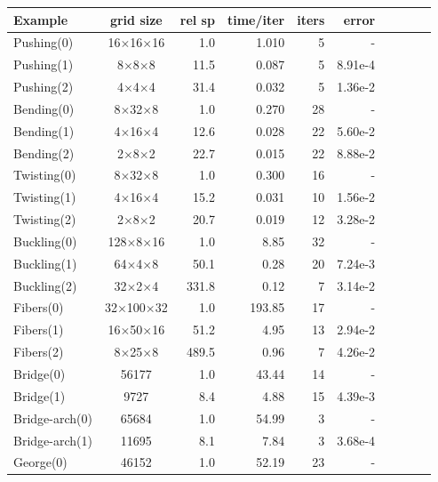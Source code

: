 \begin{table}[!h]
	\centering
	\footnotesize
	\begin{tabular}{l c r r r r r r r r}
		\hline 
		\textbf{Example} &\textbf{grid size}&\textbf{rel sp}&\textbf{time/iter}&\textbf{iters}&\textbf{error}\\
		\hline
		{\color{HiResColor}Pushing(0)} &16$\times$16$\times$16&1.0 &1.010 &5&-\\
		{\color{DDFEMColor}Pushing(1)} &8$\times$8$\times$8   &11.5&0.087&5&8.91e-4\\
		{\color{DDFEMColor}Pushing(2)} &4$\times$4$\times$4   &31.4&0.032&5&1.36e-2\\
		\hline 
		{\color{HiResColor}Bending(0)} &8$\times$32$\times$8&1.0   &0.270 &28&-\\
		{\color{DDFEMColor}Bending(1)} &4$\times$16$\times$4&12.6  &0.028 & 22& 5.60e-2\\
		{\color{DDFEMColor}Bending(2)} &2$\times$8$\times$2 &22.7  &0.015 & 22&8.88e-2\\
		\hline 
		{\color{HiResColor}Twisting(0)} &8$\times$32$\times$8&1.0  & 0.300 & 16&-\\
		{\color{DDFEMColor}Twisting(1)} &4$\times$16$\times$4&15.2 & 0.031 & 10&1.56e-2\\
		{\color{DDFEMColor}Twisting(2)} &2$\times$8$\times$2 &20.7 & 0.019 & 12&3.28e-2\\
		\hline
		{\color{HiResColor}Buckling(0)} &128$\times$8$\times$16&1.0   &8.85 &32&-\\
		{\color{DDFEMColor}Buckling(1)} &64$\times$4$\times$8  &50.1 &0.28 &20&7.24e-3\\
		{\color{DDFEMColor}Buckling(2) }&32$\times$2$\times$4  &331.8&0.12 &7 &3.14e-2\\
		\hline
		{\color{HiResColor}Fibers(0)} &32$\times$100$\times$32&1.0  &193.85&17&-\\
		{\color{DDFEMColor}Fibers(1)} &16$\times$50$\times$16 &51.2 &4.95  &13& 2.94e-2\\
		{\color{DDFEMColor}Fibers(2)} &8$\times$25$\times$8   &489.5&0.96  &7 & 4.26e-2\\
		\hline
		{\color{HiResColor}Bridge(0)} &56177&1.0&43.44&14&-\\
		{\color{DDFEMColor}Bridge(1)} &9727&8.4&4.88&15&4.39e-3\\
		{\color{HiResColor}Bridge-arch(0)} &65684&1.0&54.99&3&-\\
		{\color{DDFEMColor}Bridge-arch(1)} &11695&8.1&7.84&3&3.68e-4\\
		\hline
		{\color{HiResColor}George(0)} &46152 & 1.0&52.19&23&-\\

\end{tabular}
\end{table}
